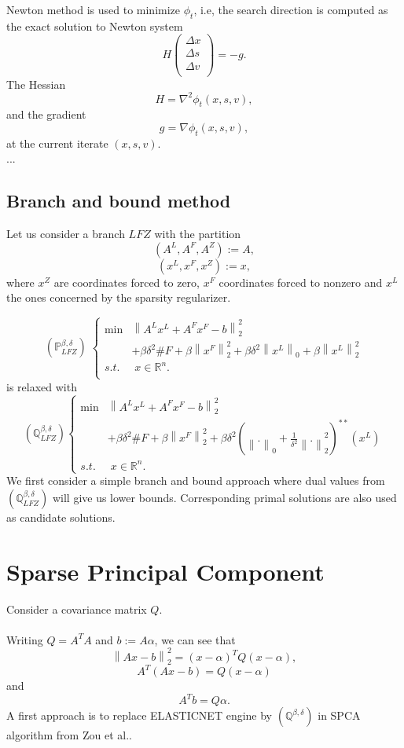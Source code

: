 \documentclass[fleqn]{report} %
\begin{document}
Newton method is used to minimize $\phi_t$, i.e, the search direction is computed as the exact solution to Newton system
\[
H\left(\begin{array}{l}
\Delta x\\
\Delta s\\
\Delta v\\
\end{array}\right) = -g.
\]
The Hessian 
\[
H =\nabla^2\phi_t(x, s, v),
\]
and the gradient 
\[
g =\nabla\phi_t(x, s, v),
\]
at the current iterate $(x, s, v)$.\\
...
\subsection{Branch and bound method}
Let us consider a branch $LFZ$ with the partition 
\[
(A^{L}, A^{F}, A^{Z}):=A,
\] 
\[
(x^{L}, x^{F}, x^{Z}):=x,
\]
where $x^{Z}$ are coordinates forced to zero, $x^{F}$ coordinates forced to nonzero and $x^{L}$ the ones concerned by the sparsity regularizer.

\[
(\mathbb{P}^{\beta, \delta}_{LFZ})\;
\left\{
\begin{array}{ll}\min & \left\|A^{L}x^{L}+A^{F}x^{F}-b\right\|^2_2\\
& + \beta\delta^2\#F + \beta\left\|x^{F}\right\|^2_2+ \beta\delta^2\left\|x^{L}\right\|_0 + \beta\left\|x^{L}\right\|^2_2  \\
	s.t.&\;x\in\mathbb{R}^n.\\
\end{array} 
\right.
\]
is relaxed with
\[
(\mathbb{Q}^{\beta,\delta}_{LFZ})\left\{\begin{array}{ll}\min & \left\|A^{L}x^{L}+A^{F}x^{F}-b\right\|^2_2\\
&+ \beta\delta^2\#F + \beta\left\|x^{F}\right\|^2_2 + \beta\delta^2\left(\left\|.\right\|_0 + \frac{1}{\delta^2}\left\|.\right\|_2^2\right)^{**}(x^{L})\\
s.t.&\;x\in\mathbb{R}^n.
\end{array} \right.
\]
We first consider a simple branch and bound approach where dual values from $(\mathbb{Q}^{\beta,\delta}_{LFZ})$ will give us lower bounds.  Corresponding primal solutions are also used as candidate solutions.
\section{Sparse Principal Component}
Consider a covariance matrix $Q$.\\\\ 
Writing $Q = A^TA$ and $b := A\alpha$, we can see that 
\[\left\|Ax-b\right\|^2_2=(x-\alpha)^TQ(x-\alpha),
\]
\[
A^T(Ax-b)=Q(x-\alpha)
\]
and 
\[
A^Tb = Q\alpha.
\]
A first approach is to replace ELASTICNET engine by  $(\mathbb{Q}^{\beta,\delta})$ in SPCA algorithm from Zou et al..
\end{document}
